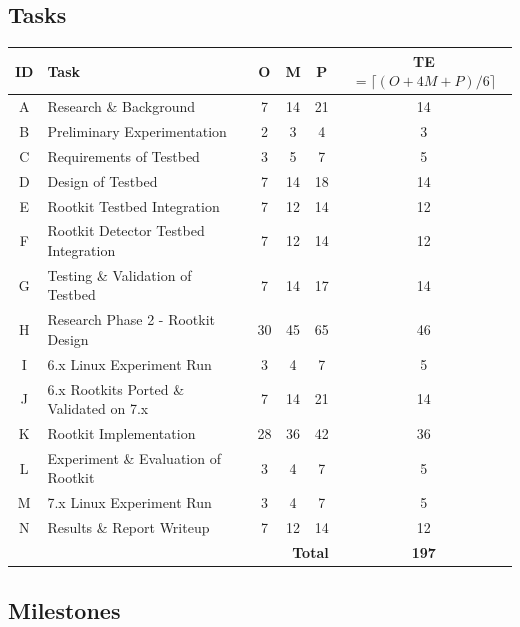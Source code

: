 \documentclass[10pt, a4paper]{article} %
\begin{document}
\subsection*{Tasks}
\begin{table}[h]
  \centering
  \begin{tabular}{|c|l|c|c|c|c|}
    \hline
    \textbf{ID} & \textbf{Task} & \textbf{O} & \textbf{M} & \textbf{P} & \textbf{TE} $= \lceil (O+4M+P)/6 \rceil$ \\
    \hline
    A & Research \& Background       & 7  & 14 & 21 & 14 \\
    \hline
    B & Preliminary Experimentation         & 2  & 3  & 4  & 3  \\
    \hline
    C & Requirements of Testbed       & 3  & 5  & 7  & 5  \\
    \hline
    D & Design of Testbed      & 7  & 14 & 18 & 14 \\
    \hline
    E & Rootkit Testbed Integration           & 7  & 12 & 14 & 12 \\
    \hline
    F & Rootkit Detector Testbed Integration             & 7  & 12 & 14 & 12 \\
    \hline
    G & Testing \& Validation of Testbed & 7 & 14 & 17 & 14 \\
    \hline
    H & Research Phase 2 - Rootkit Design & 30 & 45 & 65 & 46 \\
    \hline
    I & 6.x Linux Experiment Run & 3 & 4 & 7 & 5 \\
    \hline
    J & 6.x Rootkits Ported \& Validated on 7.x & 7 & 14 & 21 & 14 \\
    \hline
    K & Rootkit Implementation & 28 & 36 & 42 & 36 \\
    \hline
    L & Experiment \& Evaluation of Rootkit & 3 & 4 & 7 & 5 \\
    \hline
    M & 7.x Linux Experiment Run & 3 & 4 & 7 & 5 \\
    \hline
    N & Results \& Report Writeup & 7 & 12 & 14 & 12 \\
    \hline
    \multicolumn{5}{|r|}{\textbf{Total}} & \textbf{197} \\
    \hline
  \end{tabular}
\end{table}

\subsection*{Milestones}
\end{document}
